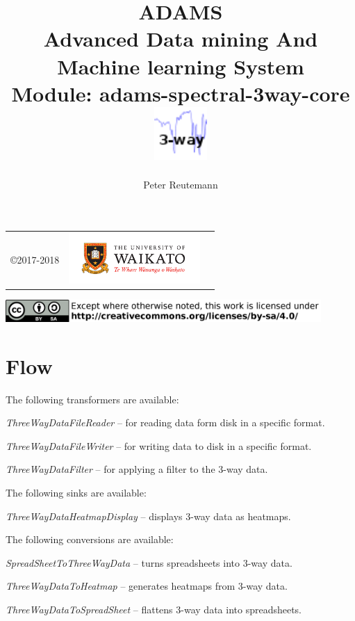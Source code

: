 \documentclass[a4paper]{book}
\title{
  \textbf{ADAMS} \\
  {\Large \textbf{A}dvanced \textbf{D}ata mining \textbf{A}nd \textbf{M}achine
  learning \textbf{S}ystem} \\
  {\Large Module: adams-spectral-3way-core} \\
  \vspace{1cm}
  \includegraphics[width=2cm]{images/spectral-3way-core-module.png} \\
}
\author{
  Peter Reutemann
}
\begin{document}
\begin{titlepage}
\maketitle

\thispagestyle{empty}
\center
\begin{table}[b]
	\begin{tabular}{c l l}
		\parbox[c][2cm]{2cm}{\copyright 2017-2018} &
		\parbox[c][2cm]{5cm}{\includegraphics[width=5cm]{images/coat_of_arms.pdf}} \\
	\end{tabular}
	\includegraphics[width=12cm]{images/cc.png} \\
\end{table}

\end{titlepage}

\tableofcontents

\chapter{Flow}
The following transformers are available:
\begin{tight_itemize}
  \item \textit{ThreeWayDataFileReader} -- for reading data form disk in a
  specific format.
  \item \textit{ThreeWayDataFileWriter} -- for writing data to disk in a
  specific format.
  \item \textit{ThreeWayDataFilter} -- for applying a filter to the 3-way data.
\end{tight_itemize}

\noindent The following sinks are available:
\begin{tight_itemize}
  \item \textit{ThreeWayDataHeatmapDisplay} -- displays 3-way data as heatmaps.
\end{tight_itemize}

\noindent The following conversions are available:
\begin{tight_itemize}
  \item \textit{SpreadSheetToThreeWayData} -- turns spreadsheets into 3-way data.
  \item \textit{ThreeWayDataToHeatmap} -- generates heatmaps from 3-way data.
  \item \textit{ThreeWayDataToSpreadSheet} -- flattens 3-way data into spreadsheets.
\end{tight_itemize}



\end{document}
